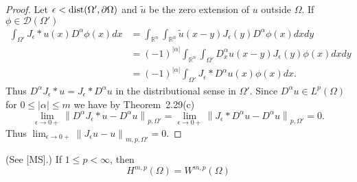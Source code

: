 \begin{proof}
  Let $\epsilon<\operatorname{dist} (\Omega', \partial\Omega)$ 
  and $\tilde{u}$ be the zero extension of $u$ outside $\Omega$.
  If $\phi \in \mathscr{D}\left(\Omega'\right)$
  \[
  \begin{aligned}
    \int_{\Omega'} J_\epsilon * u(x) D^\alpha \phi(x) d x
    & = \int_{\mathbb{R}^n} \int_{\mathbb{R}^n} \tilde{u}(x-y) J_\epsilon(y) 
        D^\alpha \phi(x) d x d y \\
    & = (-1)^{|\alpha|} \int_{\mathbb{R}^n} \int_{\Omega'}
        D_x^\alpha u(x-y) J_\epsilon(y) \phi(x) d x d y \\
    & = (-1)^{|\alpha|} \int_{\Omega'} J_\epsilon * D^\alpha u(x) \phi(x) d x .
  \end{aligned}
  \]
  Thus $D^\alpha J_\epsilon * u=J_\epsilon * D^\alpha u$ in the distributional sense
  in $\Omega'$. Since $D^\alpha u \in L^p(\Omega)$ for $0 \leq|\alpha| \leq m$
  we have by Theorem~2.29(c)
  \[
  \lim _{\epsilon \rightarrow 0+}\left\|D^\alpha J_\epsilon * u-D^\alpha u\right\|_{p, \Omega'}=\lim _{\epsilon \rightarrow 0+}\left\|J_\epsilon * D^\alpha u-D^\alpha u\right\|_{p, \Omega'}=0 .
  \]
  Thus $\lim _{\epsilon \rightarrow 0+}\left\|J_\epsilon u-u\right\|_{m, p, \Omega'}=0$.
\end{proof}


\begin{theorem}[$\bm{H} = \bm{W}$]
  (See [MS].) If $1 \leq p<\infty$, then
  \[
  H^{m, p}(\Omega)=W^{m, p}(\Omega)
  \]
\end{theorem}

